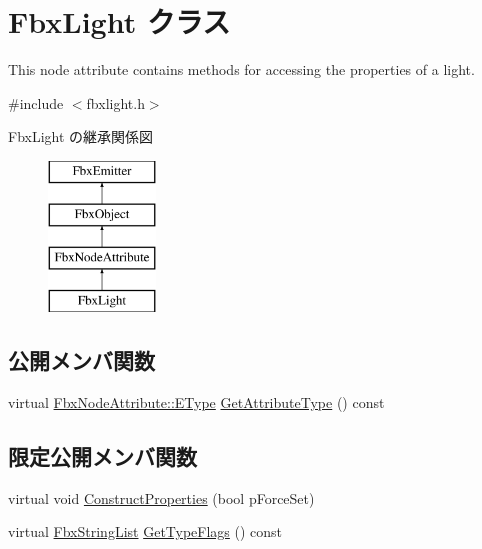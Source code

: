 \hypertarget{class_fbx_light}{}\section{Fbx\+Light クラス}
\label{class_fbx_light}


This node attribute contains methods for accessing the properties of a light.  




{\ttfamily \#include $<$fbxlight.\+h$>$}

Fbx\+Light の継承関係図\begin{figure}[H]
\begin{center}
\leavevmode
\includegraphics[height=4.000000cm]{class_fbx_light}
\end{center}
\end{figure}
\subsection*{公開メンバ関数}
\begin{DoxyCompactItemize}
\item 
virtual \hyperlink{class_fbx_node_attribute_a08e1669d3d1a696910756ab17de56d6a}{Fbx\+Node\+Attribute\+::\+E\+Type} \hyperlink{class_fbx_light_a0a0ef9dd3eacb2cadb30416d13ea8e7d}{Get\+Attribute\+Type} () const
\end{DoxyCompactItemize}
\subsection*{限定公開メンバ関数}
\begin{DoxyCompactItemize}
\item 
virtual void \hyperlink{class_fbx_light_aaa406a871272d3f36c6300ab81f312c5}{Construct\+Properties} (bool p\+Force\+Set)
\item 
virtual \hyperlink{class_fbx_string_list}{Fbx\+String\+List} \hyperlink{class_fbx_light_a962256338837265748540bd0b3d9b511}{Get\+Type\+Flags} () const
\end{DoxyCompactItemize}
